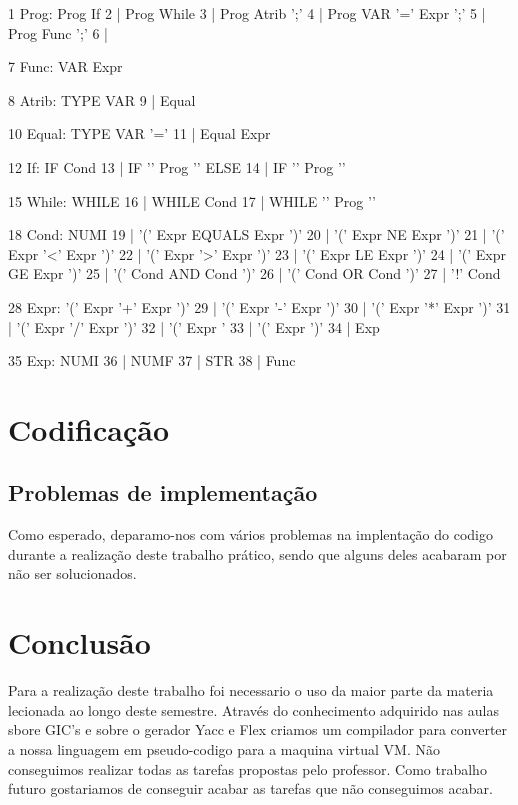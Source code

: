 \documentclass{report}
\begin{document}
\begin{code}

    1 Prog: Prog If
    2     | Prog While
    3     | Prog Atrib ';'
    4     | Prog VAR '=' Expr ';'
    5     | Prog Func ';'
    6     | %

    7 Func: VAR Expr

    8 Atrib: TYPE VAR
    9      | Equal

   10 Equal: TYPE VAR '='
   11      | Equal Expr

   12 If: IF Cond
   13   | IF '{' Prog '}' ELSE
   14   | IF '{' Prog '}'

   15 While: WHILE
   16      | WHILE Cond
   17      | WHILE '{' Prog '}'

   18 Cond: NUMI
   19     | '(' Expr EQUALS Expr ')'
   20     | '(' Expr NE Expr ')'
   21     | '(' Expr '<' Expr ')'
   22     | '(' Expr '>' Expr ')'
   23     | '(' Expr LE Expr ')'
   24     | '(' Expr GE Expr ')'
   25     | '(' Cond AND Cond ')'
   26     | '(' Cond OR Cond ')'
   27     | '!' Cond

   28 Expr: '(' Expr '+' Expr ')'
   29     | '(' Expr '-' Expr ')'
   30     | '(' Expr '*' Expr ')'
   31     | '(' Expr '/' Expr ')'
   32     | '(' Expr '%
   33     | '(' Expr ')'
   34     | Exp

   35 Exp: NUMI
   36    | NUMF
   37    | STR
   38    | Func

\end{code}

\chapter{Codificação}
\section{Problemas de implementação}
\indent
Como esperado, deparamo-nos com vários problemas na implentação do codigo durante a realização deste trabalho prático, sendo que alguns deles acabaram por não ser solucionados.

\chapter{Conclusão} \label{concl}
 \indent
 Para a realização deste trabalho foi necessario o uso da maior parte da materia lecionada ao longo deste semestre. Através do conhecimento adquirido nas aulas sbore GIC's e sobre o gerador Yacc e Flex criamos um compilador para converter a nossa linguagem em pseudo-codigo para a maquina virtual VM. Não conseguimos realizar todas as tarefas propostas pelo professor.
 \indent
 Como trabalho futuro gostariamos de conseguir acabar as tarefas que não conseguimos acabar.
\end{document}
